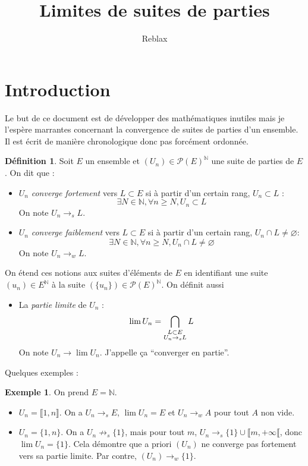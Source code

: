 \documentclass{article}
\title{Limites de suites de parties}
\author{Reblax}
\date{}
\newcommand{\N}{\mathbb{N}}
\renewcommand{\P}{\mathcal{P}}
\theoremstyle{plain}
\theoremstyle{definition}
\newtheorem{definition}[theorem]{Définition}
\newtheorem{example}[theorem]{Exemple}
\theoremstyle{remark}
\begin{document}
\maketitle

\tableofcontents

\section{Introduction}

Le but de ce document est de développer des mathématiques inutiles mais je l'espère marrantes concernant la convergence de suites de parties d'un ensemble. Il est écrit de manière chronologique donc pas forcément ordonnée.

\begin{definition}
    Soit $E$ un ensemble et $(U_n) \in \P(E)^\N$ une suite de parties de $E$. On dit que :
    \begin{itemize}
        \item $U_n$ \emph{converge fortement} vers $L \subset E$ si à partir d'un certain rang, $U_n \subset L$ :
        \[\exists N \in \N, \forall n \ge N, U_n \subset L\]
        On note $U_n \to_s L$.
        \item $U_n$ \emph{converge faiblement} vers $L \subset E$ si à partir d'un certain rang, $U_n \cap L \ne \varnothing$:
        \[\exists N \in \N, \forall n \ge N, U_n \cap L \ne \varnothing\]
        On note $U_n \to_w L$.
    \end{itemize}
    On étend ces notions aux suites d'éléments de $E$ en identifiant une suite $(u_n) \in E^\N$ à la suite $(\{u_n\}) \in \P(E)^\N$.
    On définit aussi
    \begin{itemize}
        \item La \emph{partie limite} de $U_n$ :
        \[\lim U_n = \bigcap_{\begin{subarray}{c} L \subset E \\ U_n \to_s L \end{subarray}} L\]
        On note $U_n \to \lim U_n$. J'appelle ça ``converger en partie''.
    \end{itemize}
\end{definition}

Quelques exemples :

\begin{example}
    On prend $E = \N$.
    \begin{itemize}
        \item $U_n = \llbracket 1,n\rrbracket$. On a $U_n \to_s E$, $\lim U_n = E$ et $U_n \to_w A$ pour tout $A$ non vide.
        \item $U_n = \{1,n\}$. On a $U_n \not \to_s \{1\}$, mais pour tout $m$, $U_n \to_s \{1\} \cup \llbracket m, +\infty \llbracket$, donc $\lim U_n = \{1\}$. Cela démontre que a priori $(U_n)$ ne converge pas fortement vers sa partie limite. Par contre, $(U_n) \to_w \{1\}$.
    \end{itemize}
\end{example}
\end{document}
